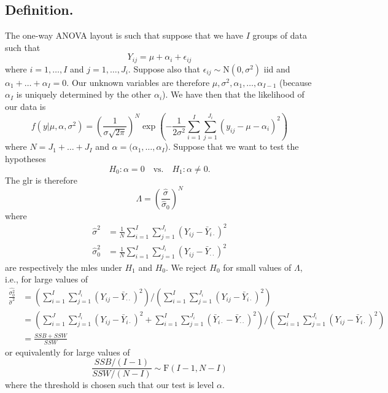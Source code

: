 \documentclass[titlepage]{article}
\begin{document}
\subsection{Definition.} The one-way ANOVA layout is such that suppose that we have $I$ groups of data such that 
$$Y_{ij} = \mu + \alpha_{i} + \epsilon_{ij}$$
where $i = 1, \ldots, I$ and $j = 1, \ldots, J_{i}$. Suppose also that $\epsilon_{ij} \sim \text{N}(0, \sigma^{2})$ iid and $\alpha_{1} + \ldots + \alpha_{I} = 0$. Our unknown variables are therefore $\mu, \sigma^{2}, \alpha_{1}, \ldots, \alpha_{I-1}$ (because $\alpha_{I}$ is uniquely determined by the other $\alpha_{i}$). We have then that the likelihood of our data is 
$$f(y|\mu, \alpha, \sigma^{2}) = \left(\frac{1}{\sigma\sqrt{2\pi}}\right)^{N}\exp\left(-\frac{1}{2\sigma^{2}}\sum_{i=1}^{I}\sum_{j=1}^{J_{i}}(y_{ij} - \mu - \alpha_{i})^{2}\right)$$
where $N = J_{1} + \ldots + J_{I}$ and $\alpha = (\alpha_{1}, \ldots, \alpha_{I}$). Suppose that we want to test the hypotheses
$$H_{0}: \alpha = 0 \quad \text{vs.} \quad H_{1}: \alpha \neq 0.$$
The glr is therefore 
$$\Lambda = \left(\frac{\hat{\sigma}}{\hat{\sigma}_{0}}\right)^{N}$$
where 
\begin{align*}
        \hat{\sigma}^{2} &= \frac{1}{N}\sum_{i=1}^{I}\sum_{j=1}^{J_{i}}(Y_{ij} - \bar{Y}_{i\cdot})^{2} \\
    \hat{\sigma}_{0}^{2} &= \frac{1}{N}\sum_{i=1}^{I}\sum_{j=1}^{J_{i}}(Y_{ij} - \bar{Y}_{\cdot\cdot})^{2}
\end{align*}
are respectively the mles under $H_{1}$ and $H_{0}$. We reject $H_{0}$ for small values of $\Lambda$, i.e., for large values of 
\begin{align*}
    \frac{\hat{\sigma_{0}^{2}}}{\hat{\sigma}^{2}} &= \left(\sum_{i=1}^{I}\sum_{j=1}^{J_{i}}(Y_{ij} - \bar{Y}_{\cdot\cdot})^{2}\right) / \left(\sum_{i=1}^{I}\sum_{j=1}^{J_{i}}(Y_{ij} - \bar{Y}_{i\cdot})^{2}\right) \\
                                          &= \left(\sum_{i=1}^{J}\sum_{j=1}^{J_{i}}(Y_{ij} - \bar{Y}_{i\cdot})^{2} + \sum_{i=1}^{I}\sum_{j=1}^{J_{i}}(\bar{Y}_{i\cdot} - \bar{Y}_{\cdot\cdot})^{2}\right) / \left(\sum_{i=1}^{I}\sum_{j=1}^{J_{i}}(Y_{ij} - \bar{Y}_{i\cdot})^{2}\right) \\
                                          &= \frac{SSB + SSW}{SSW}
\end{align*}
or equivalently for large values of 
$$\frac{SSB/(I-1)}{SSW/(N-I)} \sim \text{F}(I-1, N-I)$$
where the threshold is chosen such that our test is level $\alpha$.
\end{document}
